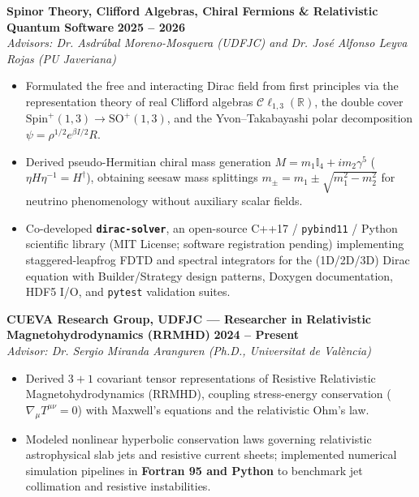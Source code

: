 \documentclass[10pt,a4paper]{article}
\begin{document}
\textbf{Spinor Theory, Clifford Algebras, Chiral Fermions \& Relativistic Quantum Software} \hfill \textbf{2025 -- 2026}\\
\textit{Advisors: Dr. Asdr\'ubal Moreno-Mosquera (UDFJC) and Dr. Jos\'e Alfonso Leyva Rojas (PU Javeriana)}
\begin{itemize}
  \item Formulated the free and interacting Dirac field from first principles via the representation theory of real Clifford algebras $\mathcal{C}\ell_{1,3}(\mathbb{R})$, the double cover $\mathrm{Spin}^+(1,3) \to \mathrm{SO}^+(1,3)$, and the Yvon--Takabayashi polar decomposition $\psi = \rho^{1/2} e^{\beta I / 2} R$.
  \item Derived pseudo-Hermitian chiral mass generation $M = m_1 \mathbb{I}_4 + i m_2 \gamma^5$ ($\eta H \eta^{-1} = H^\dagger$), obtaining seesaw mass splittings $m_\pm = m_1 \pm \sqrt{m_1^2 - m_2^2}$ for neutrino phenomenology without auxiliary scalar fields.
  \item Co-developed \textbf{\texttt{dirac-solver}}, an open-source C++17 / \texttt{pybind11} / Python scientific library (MIT License; software registration pending) implementing staggered-leapfrog FDTD and spectral integrators for the (1D/2D/3D) Dirac equation with Builder/Strategy design patterns, Doxygen documentation, HDF5 I/O, and \texttt{pytest} validation suites.
\end{itemize}

\vspace{3pt}
\textbf{CUEVA Research Group, UDFJC --- Researcher in Relativistic Magnetohydrodynamics (RRMHD)} \hfill \textbf{2024 -- Present}\\
\textit{Advisor: Dr. Sergio Miranda Aranguren (Ph.D., Universitat de Val\`encia)}
\begin{itemize}
  \item Derived $3+1$ covariant tensor representations of Resistive Relativistic Magnetohydrodynamics (RRMHD), coupling stress-energy conservation ($\nabla_\mu T^{\mu\nu} = 0$) with Maxwell's equations and the relativistic Ohm's law.
  \item Modeled nonlinear hyperbolic conservation laws governing relativistic astrophysical slab jets and resistive current sheets; implemented numerical simulation pipelines in \textbf{Fortran 95 and Python} to benchmark jet collimation and resistive instabilities.
\end{itemize}
\end{document}
